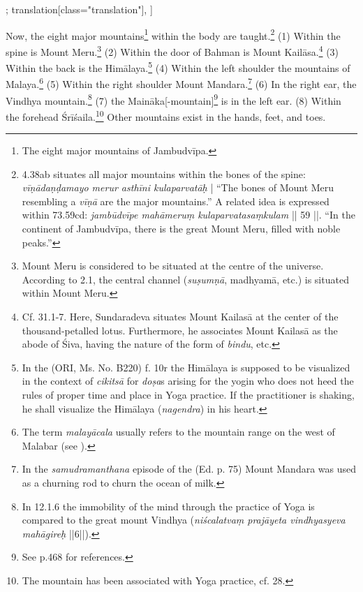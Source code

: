 \begin{alignment}[
  texts=edition[class="edition"];
  translation[class="translation"],
  ]
\begin{translation}
\begin{tlate}[p39_01]
      \noindent
Now, the eight major mountains\footnote{The eight major mountains of Jambudvīpa.} within the body are taught.\footnote{ 4.38ab situates all major mountains within the bones of the spine: \textit{vīṇādaṇḍamayo merur asthīni kulaparvatāḥ} | ``The bones of Mount Meru resembling a \textit{vīṇā} are the major mountains.'' A related idea is expressed within  73.59cd: \textit{jambūdvīpe mahāmeruṃ kulaparvatasaṃkulam} || 59 ||. ``In the continent of Jambudvīpa, there is the great Mount Meru, filled with noble peaks.''} (1) Within the spine is Mount Meru.\footnote{Mount Meru is considered to be situated at the centre of the universe. According to  2.1, the central channel (\textit{suṣumṇā}, madhyamā, etc.) is situated within Mount Meru.} (2) Within the door of Bahman is Mount Kailāsa.\footnote{Cf.  31.1-7. Here, Sundaradeva situates Mount Kailasā at the center of the thousand-petalled lotus. Furthermore, he associates Mount Kailasā as the abode of Śiva, having the nature of the form of \textit{bindu}, etc.} (3) Within the back is the Himālaya.\footnote{In the  (ORI, Ms. No. B220) f. 10r the Himālaya is supposed to be visualized in the context of \textit{cikitsā} for \textit{doṣa}s arising for the yogin who does not heed the rules of proper time and place in Yoga practice. If the practitioner is shaking, he shall visualize the Himālaya (\textit{nagendra}) in his heart.} (4) Within the left shoulder the mountains of Malaya.\footnote{The term \textit{malayācala} usually refers to the mountain range on the west of Malabar (see \citeauthor[1858:37]{petersburger5}).} (5) Within the right shoulder Mount Mandara.\footnote{In the \textit{samudramanthana} episode of the  (Ed. p. 75) Mount Mandara was used as a churning rod to churn the ocean of milk.} (6) In the right ear, the Vindhya mountain.\footnote{In  12.1.6 the immobility of the mind through the practice of Yoga is compared to the great mount Vindhya (\textit{niścalatvaṃ prajāyeta vindhyasyeva mahāgireḥ} ||6||).} (7) the Maināka[-mountain]\footnote{See  p.468 for references.} is in the left ear. (8) Within the forehead Śrīśaila.\footnote{The mountain has been associated with Yoga practice, cf.  28.} Other mountains exist in the hands, feet, and toes.
\end{tlate}
\end{translation}
\end{alignment}
